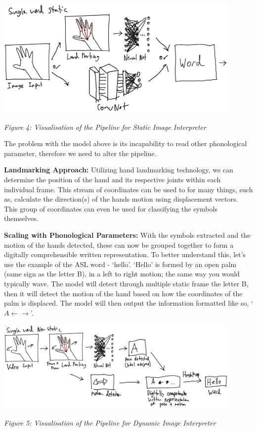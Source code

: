 \documentclass[11pt]{article}
\def\paraskip{\vskip 0.4cm}
\begin{document}
        \begin{center}
            \includegraphics[width=12cm]{images/staticModel.png}
            \\
            \raggedright \textit{
            Figure 4: Visualisation of the Pipeline for Static Image Interpreter
            }
        \end{center}

        The problem with the model above is its incapability to read other phonological parameter, therefore we need to alter the pipeline. 
        
        \paraskip

        \noindent\textbf{Landmarking Approach: } Utilizing hand landmarking technology, we can determine the position of the hand and its respective joints within each individual frame. This stream of coordinates can be used to for many things, such as, calculate the direction(s) of the hands motion using displacement vectors. This group of coordinates can even be used for classifying the symbols themselves.

        \paraskip

        \noindent\textbf{Scaling with Phonological Parameters: } With the symbols extracted and the motion of the hands detected, these can now be grouped together to form a digitally comprehensible written representation. To better understand this, let's use the example of the ASL word - `hello'. `Hello' is formed by an open palm (same sign as the letter B), in a left to right motion; the same way you would typically wave. The model will detect through multiple static frame the letter B, then it will detect the motion of the hand based on how the coordinates of the palm is displaced. The model will then output the information formatted like so, `$A \leftarrow \rightarrow$'.

        \begin{center}
            \includegraphics[width=12cm]{images/nonstaticModel.png}
            \\
            \raggedright \textit{
            Figure 5: Visualisation of the Pipeline for Dynamic Image Interpreter
            }
        \end{center}
        
\end{document}
